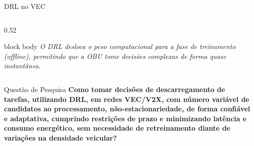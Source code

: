 \documentclass{beamer}
\begin{document}
\begin{frame}{DRL no VEC}
\begin{columns}[T]
\begin{column}{0.52\textwidth}
            
            \vspace{0.1cm}
            \begin{beamercolorbox}[wd=\textwidth, sep=3pt, center, rounded=true]{block body}
                \scriptsize \textit{O DRL desloca o peso computacional para a fase de treinamento (offline), permitindo que a OBU tome decisões complexas de forma quase instantânea.}
            \end{beamercolorbox}
        \end{column}
    \end{columns}
\end{frame}

\begin{frame}{Questão de Pesquisa}
    \vspace{0.8cm}
    \centering
    \large \bfseries
    Como tomar decisões de descarregamento de tarefas, utilizando DRL, em redes
VEC/V2X, com número variável de candidatos ao processamento, não-estacionariedade, de forma confiável e adaptativa, cumprindo restrições de prazo e minimizando latência e consumo energético, sem necessidade de retreinamento diante de variações na densidade veicular?
\end{frame}
\end{document}
